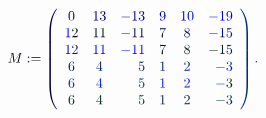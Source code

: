 \documentclass[12pt]{article}
\begin{document}
\makeatletter
\renewcommand*{\@textcolor}[3]{%
  \protect\leavevmode
  \begingroup
    \color#1{#2}#3%
  \endgroup
}
\makeatother
\begin{displaymath}
\mathcolor[RGB]{0,0,15}{M} \mathcolor[RGB]{0,0,30}{:} \mathcolor[RGB]{0,0,45}{=} \mathcolor[RGB]{0,0,60}{\left(} \begin{array} {ccrccr} { \mathcolor[RGB]{0,0,75}{0} } & { \mathcolor[RGB]{0,0,90}{1} \mathcolor[RGB]{0,0,105}{3} } & { \mathcolor[RGB]{0,0,120}{-} \mathcolor[RGB]{0,0,135}{1} \mathcolor[RGB]{0,0,150}{3} } & { \mathcolor[RGB]{0,0,165}{9} } & { \mathcolor[RGB]{0,0,180}{1} \mathcolor[RGB]{0,0,195}{0} } & { \mathcolor[RGB]{0,0,210}{-} \mathcolor[RGB]{0,0,225}{1} \mathcolor[RGB]{0,0,240}{9} } \\ { \mathcolor[RGB]{0,0,255}{1} \mathcolor[RGB]{0,15,0}{2} } & { \mathcolor[RGB]{0,15,15}{1} \mathcolor[RGB]{0,15,30}{1} } & { \mathcolor[RGB]{0,15,45}{-} \mathcolor[RGB]{0,15,60}{1} \mathcolor[RGB]{0,15,75}{1} } & { \mathcolor[RGB]{0,15,90}{7} } & { \mathcolor[RGB]{0,15,105}{8} } & { \mathcolor[RGB]{0,15,120}{-} \mathcolor[RGB]{0,15,135}{1} \mathcolor[RGB]{0,15,150}{5} } \\ { \mathcolor[RGB]{0,15,165}{1} \mathcolor[RGB]{0,15,180}{2} } & { \mathcolor[RGB]{0,15,195}{1} \mathcolor[RGB]{0,15,210}{1} } & { \mathcolor[RGB]{0,15,225}{-} \mathcolor[RGB]{0,15,240}{1} \mathcolor[RGB]{0,15,255}{1} } & { \mathcolor[RGB]{0,30,0}{7} } & { \mathcolor[RGB]{0,30,15}{8} } & { \mathcolor[RGB]{0,30,30}{-} \mathcolor[RGB]{0,30,45}{1} \mathcolor[RGB]{0,30,60}{5} } \\ { \mathcolor[RGB]{0,30,75}{6} } & { \mathcolor[RGB]{0,30,90}{4} } & { \mathcolor[RGB]{0,30,105}{5} } & { \mathcolor[RGB]{0,30,120}{1} } & { \mathcolor[RGB]{0,30,135}{2} } & { \mathcolor[RGB]{0,30,150}{-} \mathcolor[RGB]{0,30,165}{3} } \\ { \mathcolor[RGB]{0,30,180}{6} } & { \mathcolor[RGB]{0,30,195}{4} } & { \mathcolor[RGB]{0,30,210}{5} } & { \mathcolor[RGB]{0,30,225}{1} } & { \mathcolor[RGB]{0,30,240}{2} } & { \mathcolor[RGB]{0,30,255}{-} \mathcolor[RGB]{0,45,0}{3} } \\ { \mathcolor[RGB]{0,45,15}{6} } & { \mathcolor[RGB]{0,45,30}{4} } & { \mathcolor[RGB]{0,45,45}{5} } & { \mathcolor[RGB]{0,45,60}{1} } & { \mathcolor[RGB]{0,45,75}{2} } & { \mathcolor[RGB]{0,45,90}{-} \mathcolor[RGB]{0,45,105}{3} } \end{array} \mathcolor[RGB]{0,45,120}{\right)} \mathcolor[RGB]{0,45,135}{.}
\end{displaymath}
\end{document}
